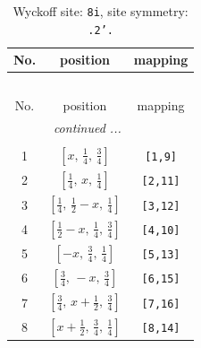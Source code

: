 \documentclass[fleqn,8pt]{jsarticle}
\begin{document}
\renewcommand{\arraystretch}{1.2}
\begin{longtable}{ccc}
\caption{Wyckoff site: {\tt 8i}, site symmetry: {\tt .2'.}}
 \\
 \hline \hline
No. & position & mapping \\ \hline \endfirsthead

\multicolumn{2}{l}{\tablename\ \thetable{}} \\
 \hline \hline
No. & position & mapping \\ \hline \endhead

 \hline \hline
\multicolumn{2}{r}{\footnotesize\it continued ...} \\ \endfoot

 \hline \hline
\multicolumn{2}{r}{} \\ \endlastfoot

1 & $\left[ x,\, \frac{1}{4},\, \frac{3}{4} \right]$ & {\tt [1,9]} \\ \hline
2 & $\left[ \frac{1}{4},\, x,\, \frac{1}{4} \right]$ & {\tt [2,11]} \\ \hline
3 & $\left[ \frac{1}{4},\, \frac{1}{2} - x,\, \frac{1}{4} \right]$ & {\tt [3,12]} \\ \hline
4 & $\left[ \frac{1}{2} - x,\, \frac{1}{4},\, \frac{3}{4} \right]$ & {\tt [4,10]} \\ \hline
5 & $\left[ - x,\, \frac{3}{4},\, \frac{1}{4} \right]$ & {\tt [5,13]} \\ \hline
6 & $\left[ \frac{3}{4},\, - x,\, \frac{3}{4} \right]$ & {\tt [6,15]} \\ \hline
7 & $\left[ \frac{3}{4},\, x + \frac{1}{2},\, \frac{3}{4} \right]$ & {\tt [7,16]} \\ \hline
8 & $\left[ x + \frac{1}{2},\, \frac{3}{4},\, \frac{1}{4} \right]$ & {\tt [8,14]} \\
\end{longtable}
\renewcommand{\arraystretch}{1.2}
\end{document}
